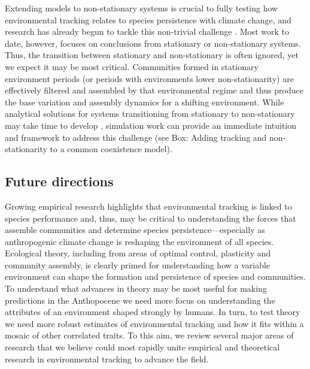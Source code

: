 \documentclass[11pt,letterpaper]{article}
\begin{document}
Extending models to non-stationary systems is crucial to fully testing how environmental tracking relates to species persistence with climate change, and research has already begun to tackle this non-trivial challenge \citep{chessonnonstat,legault2019,volkerass}. Most work to date, however, focuses on conclusions from stationary or non-stationary systems. Thus, the transition between stationary and non-stationary is often ignored, yet we expect it may be most critical. Communities formed in stationary environment periods (or periods with environments lower non-stationarity) are effectively filtered and assembled by that environmental regime and thus produce the base variation and assembly dynamics for a shifting environment. While analytical solutions for systems transitioning from stationary to non-stationary may take time to develop \citep{chessonnonstat}, simulation work can provide an immediate intuition and framework to address this challenge (see Box: Adding tracking and non-stationarity to a common coexistence model). 

\subsection{Future directions}

Growing empirical research highlights that environmental tracking is linked to species performance and, thus, may be critical to understanding the forces that assemble communities and determine species persistence---especially as anthropogenic climate change is reshaping the environment of all species. Ecological theory, including from areas of optimal control, plasticity and community assembly, is clearly primed for understanding how a variable environment can shape the formation and persistence of species and communities. To understand what advances in theory may be most useful for making predictions in the Anthopocene we need more focus on understanding the attributes of an environment shaped strongly by humans. In turn, to test theory we need more robust estimates of environmental tracking and how it fits within a mosaic of other correlated traits. To this aim, we review several major areas of research that we believe could most rapidly unite empirical and theoretical research in environmental tracking to advance the field.\\ %
\end{document}
